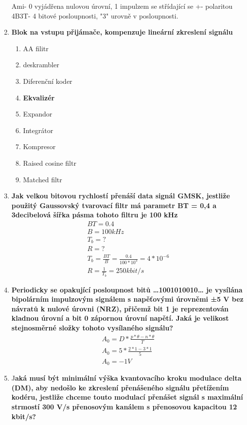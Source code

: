 \begin{enumerate}
    Ami- 0 vyjádřena nulovou úrovní, 1 impulzem se střídající se +- polaritou
    4B3T- 4 bitové posloupnosti, "3" urovně v posloupnosti.
    \item  \textbf{Blok na vstupu přijámače, kompenzuje lineární zkreslení signálu}
\begin{enumerate}
    \item AA filitr
    \item deskrambler
    \item Diferenční koder
    \item  \textbf{Ekvalizér}
    \item Expandor
    \item Integrátor
    \item Kompresor
    \item Raised cosine filtr
    \item  Matched filtr
\end{enumerate}
    \item \textbf{Jak velkou bitovou rychlostí přenáší data signál GMSK, jestliže použitý Gaussovský tvarovací 
    filtr má parametr BT = 0,4 a 3decibelová šířka pásma tohoto filtru je 100 kHz}
    \begin{align*}
        BT=0.4 \\
        B= 100 kHz\\
        T_b = ? \\
        R= ? \\
        T_b=\frac{BT}{B}=\frac{0.4}{100*10^3}=4*10^{-6}\\
    R=\frac{1}{T_b}=250 kbit/s
    \end{align*}
    \item  \textbf{Periodicky se opakující posloupnost bitů …1001010010… je vysílána bipolárním impulzovým signálem s napěťovými úrovněmi ±5 V bez návratů k nulové úrovni (NRZ), přičemž bit 1 je reprezentován kladnou úrovní a bit 0 zápornou úrovní napětí. Jaká je velikost stejnosměrné složky tohoto vysílaného signálu?}
    \begin{align*}
         A_0 = D*\frac{p*\theta-n*\theta}{T} \\
         A_0=5*\frac{2*1-3*1}{5} \\
         A_0= -1V
    \end{align*}
    \item J\textbf{aká musí být minimální výška kvantovacího kroku modulace delta (DM), aby nedošlo ke 
    zkreslení přenášeného signálu přetížením kodéru, jestliže chceme touto modulací přenášet 
    signál s maximální strmostí 300 V/s přenosovým kanálem s přenosovou kapacitou 12 kbit/s?}


\end{enumerate}

